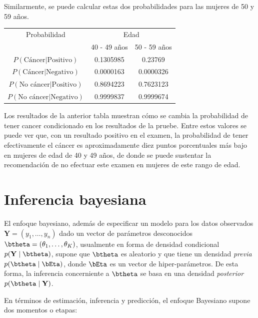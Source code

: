 \documentclass[10pt,openright]{book}\usepackage[]{graphicx}\usepackage[]{color}
\begin{document}
\begin{Eje}
Similarmente, se puede calcular estas dos probabilidades para las mujeres de 50 y 59 años.
\begin{table}[!h]
\centering
  \begin{tabular}{|c|c|c|}\hline
  Probabilidad&\multicolumn{2}{|c|}{Edad}\\\cline{2-3}
  &40 - 49 años&50 - 59 años\\\hline
  $P(\text{Cáncer}|\text{Positivo})$&0.1305985&0.23769\\
  $P(\text{Cáncer}|\text{Negativo})$&0.0000163&0.0000326\\
  $P(\text{No cáncer}|\text{Positivo})$&0.8694223&0.7623123\\
  $P(\text{No cáncer}|\text{Negativo})$&0.9999837&0.9999674\\\hline
  \end{tabular}
\end{table}
Los resultados de la anterior tabla muestran cómo se cambia la probabilidad de tener cancer condicionado en los resultados de la pruebe. Entre estos valores se puede ver que, con un resultado positivo en el examen, la probabilidad de tener efectivamente el cáncer es aproximadamente diez puntos porcentuales más bajo en mujeres de edad de 40 y 49 años, de donde se puede sustentar la recomendación de no efectuar este examen en mujeres de este rango de edad.
\end{Eje}

\section{Inferencia bayesiana}

El enfoque bayesiano, además de especificar un modelo para los datos observados $\mathbf{Y}=(y_1,\ldots,y_n)$ dado un vector de parámetros desconocidos $\btheta=(\theta_1,\ldots,\theta_K)$, usualmente en forma de densidad condicional  $p(\mathbf{Y} \mid \btheta)$, supone que $\btheta$ es aleatorio y que tiene un densidad \emph{previa} $p(\btheta \mid \bEta)$, donde $\bEta$ es un vector de hiper-parámetros. De esta forma, la inferencia concerniente a $\btheta$ se basa en una densidad \emph{posterior} $p(\btheta \mid \mathbf{Y})$.

En términos de estimación, inferencia y predicción, el enfoque Bayesiano supone dos momentos o etapas:
\end{document}
